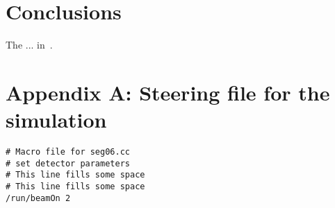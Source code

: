 \documentclass[twoside]{dis04}
\begin{document}

\clearpage



%

\section{Conclusions}
The ...
in~\cite{Aktas:2004px}.

\section{Appendix A:  Steering file for the simulation}
\begin{verbatim}
# Macro file for seg06.cc
# set detector parameters 
# This line fills some space
# This line fills some space
/run/beamOn 2
\end{verbatim}
\end{document}

